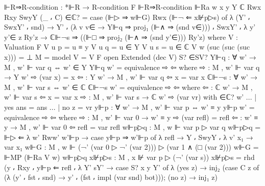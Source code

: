 \begin{spverbatim}
  ⊩R⇒R-condition : *⊩R → R-condition F
  ⊩R⇒R-condition ⊩Ra {w} {x} {y} {Y} {ℂ} Rwx Rxy SwyY (_ ⸴ C) ∈ℂ?
    = case (⊩▷ ⇒ w⊩G) Rwx (⊩¬ ⇐ x⊮p▷s) of
      λ { (Y' ⸴ SwxY' ⸴ snd) → Y' ⸴ (λ {v} v∈ → Y⊩q ⇒ proj₁ (⊩∧ ⇒ (snd v∈))) ⸴ SwxY' ⸴
      λ {y'} y'∈ {z} Ry'z → ℂ⊩¬s ⇒ ((⊩□ ⇒ proj₂ (⊩∧ ⇒ (snd y'∈))) Ry'z)}
    where
    V : Valuation F
    V u p = u ≡ y
    V u q = u ∈ Y
    V u s = u ∈ ℂ
    V w (suc (suc (suc x))) = ⊥
    M = model {V = V} F
    open Extended (dec V) S? ∈SV?
    Y⊩q : ∀ {w'} → M , w' ⊩ var q ⇔ w' ∈ Y
    Y⊩q {w'} = equivalence ⇨ ⇦
      where
      ⇨ : M , w' ⊩ var q → Y w'
      ⇨ (var x) = x
      ⇦ : Y w' → M , w' ⊩ var q
      ⇦ x = var x
    ℂ⊩¬s : ∀ {w'} → M , w' ⊩ var s ⇔ w' ∈ ℂ
    ℂ⊩¬s {w'} = equivalence ⇨ ⇦
      where
      ⇦ : ℂ w' → M , w' ⊩ var s
      ⇦ x = var x
      ⇨ : M , w' ⊩ var s → ℂ w'
      ⇨ (var vr) with ∈ℂ? w'
      ... | yes ans = ans
      ... | no z = vr
    y⊩p : ∀ {w'} → M , w' ⊩ var p ⇔ w' ≡ y
    y⊩p {w'} = equivalence ⇨ ⇦
      where ⇨ : M , w' ⊩ var 0 → w' ≡ y
            ⇨ (var refl) = refl
            ⇦ : w' ≡ y → M , w' ⊩ var 0
            ⇦ refl = var refl
    w⊩p▷q : M , w ⊩ var p ▷ var q
    w⊩p▷q = ⊩▷ ⇐ λ {w'} Rww' w'⊩p → case y⊩p ⇒ w'⊩p of
      λ {refl → Y ⸴ SwyY ⸴ λ {v'} x₁ → var x₁}
    w⊩G : M , w ⊩ (¬' (var 0 ▷ ¬' (var 2))) ▷ (var 1 ∧ (□ (var 2)))
    w⊩G = ⊩MP (⊩Ra V w) w⊩p▷q
    x⊮p▷s : M , x ⊮ var p ▷ (¬' (var s))
    x⊮p▷s = rhd (y ⸴ Rxy ⸴ y⊩p ⇐ refl ⸴ λ {Y' sY' → case S? x y Y' of
      λ { (yes z) → inj₂ (case C z of (λ { (y' ⸴ fst ⸴ snd) → y' ⸴
        (fst ⸴ impl (var snd) bot)}));
      (no z) → inj₁ z}})
\end{spverbatim}
